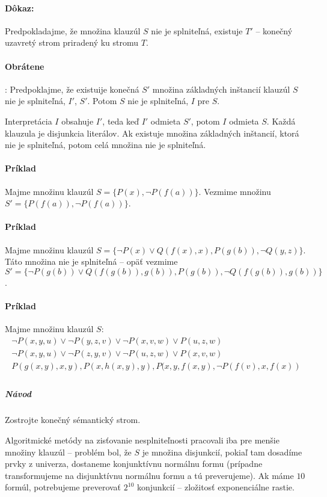 \paragraph{Dôkaz:} Predpokladajme, že množina klauzúl $S$ nie je splniteľná,
existuje $T'$ -- konečný uzavretý strom priradený ku stromu $T$.

\paragraph{Obrátene}: Predpoklajme, že existuije konečná $S'$ množina základných
inštancií klauzúl $S$ nie je splniteľná, $I'$, $S'$. Potom $S$ nie je
splniteľná, $I$ pre $S$. 

\par
Interpretácia $I$ obsahuje $I'$, teda keď $I'$ odmieta $S'$, potom $I$ odmieta
$S$. Každá klauzula je disjunkcia literálov. Ak existuje množina základných
inštancií, ktorá nie je splniteľná, potom celá množina nie je splniteľná.


\paragraph{Príklad} Majme množinu klauzúl $S=\{P(x), \neg P(f(a))\}$. Vezmime
množinu $S' = \{ P(f(a)), \neg P(f(a))\}$.

\paragraph{Príklad} Majme množinu klauzúl $S=\{\neg P(x) \lor Q(f(x),x),
P(g(b)), \neg Q(y,z) \}$. Táto množina nie je splniteľná -- opäť vezmime $$S' =
\{ \neg P(g(b)) \lor Q(f(g(b)), g(b)), P(g(b)), \neg Q(f(g(b)), g(b)) \}$$.

\paragraph{Príklad} Majme množinu klauzúl $S$:
$$
\begin{array}{l}
	\neg P(x,y,u) \lor \neg P(y,z,v) \lor \neg P(x,v,w) \lor P(u,z,w) \\
	\neg P(x,y,u) \lor \neg P(z,y,v) \lor \neg P(u,z,w) \lor P(x,v,w) \\
	P(g(x,y),x,y), P(x,h(x,y),y), P(x,y,f(x,y),\neg P(f(v),x,f(x)) \\
\end{array}
$$
\subparagraph{Návod} Zostrojte konečný sémantický strom.

\par Algoritmické metódy na zisťovanie nesplniteľnosti pracovali iba pre menšie
množiny klauzúl -- problém bol, že $S$ je množina disjunkcií, pokiaľ tam
dosadíme prvky z univerza, dostaneme konjunktívnu normálnu formu (prípadne
transformujeme na disjunktívnu normálnu formu a tú preverujeme). Ak máme $10$
formúl, potrebujeme preverovať $2^{10}$ konjunkcií -- zložitosť exponenciálne
rastie.


